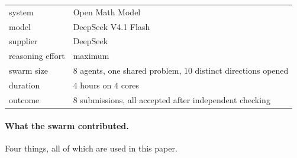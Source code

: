 \documentclass[11pt]{article}
\begin{document}
\begin{center}
\small
\begin{tabular}{@{}ll@{}}
\toprule
system & Open Math Model\\
model & DeepSeek V4.1 Flash\\
supplier & DeepSeek\\
reasoning effort & maximum\\
swarm size & $8$ agents, one shared problem, $10$ distinct directions opened\\
duration & $4$ hours on $4$ cores\\
outcome & $8$ submissions, all accepted after independent checking\\
\bottomrule
\end{tabular}
\end{center}

\paragraph{What the swarm contributed.}
Four things, all of which are used in this paper.
\end{document}
